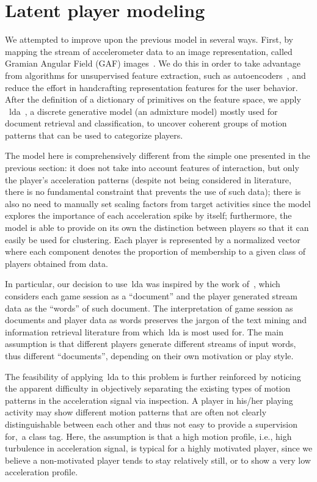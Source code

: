 \section{Latent player modeling}

We attempted to improve upon the previous model in several ways. First, by mapping the stream of accelerometer data to an image representation, called Gramian Angular Field (GAF) images~\citep{wang_imaging_2015}. We do this in order to take advantage from algorithms for unsupervised feature extraction, such as autoencoders~\citep{goodfellow_deep_2016}, and reduce the effort in handcrafting representation features for the user behavior. After the definition of a dictionary of primitives on the feature space, we apply ~\gls{lda}~\citep{blei_latent_2003}, a discrete generative model (an admixture model) mostly used for document retrieval and classification, to uncover coherent groups of motion patterns that can be used to categorize players.

The model here is comprehensively different from the simple one presented in the previous section: it does not take into account features of interaction, but only the player's acceleration patterns (despite not being considered in literature, there is no fundamental constraint that prevents the use of such data); there is also no need to manually set scaling factors from target activities since the model explores the importance of each acceleration spike by itself; furthermore, the model is able to provide on its own the distinction between players so that it can easily be used for clustering. Each player is represented by a normalized vector where each component denotes the proportion of membership to a given class of players obtained from data.

In particular, our decision to use~\gls{lda} was inspired by the work of~\cite{smith_mining_2016}, which considers each game session as a ``document'' and the player generated stream data as the ``words'' of such document. The interpretation of game session as documents and player data as words preserves the jargon of the text mining and information retrieval literature from which~\gls{lda} is most used for. The main assumption is that different players generate different streams of input words, thus different  ``documents'', depending on their own motivation or play style. 

The feasibility of applying~\gls{lda} to this problem is further reinforced by noticing the apparent difficulty in objectively separating the existing types of motion patterns in the acceleration signal via inspection. A player in his/her playing activity may show different motion patterns that are often not clearly distinguishable between each other and thus not easy to provide a supervision for,~\ie a class tag. Here, the assumption is that a high motion profile, i.e., high turbulence in acceleration signal, is typical for a highly motivated player, since we believe a non-motivated player tends to stay relatively still, or to show a very low acceleration profile.

